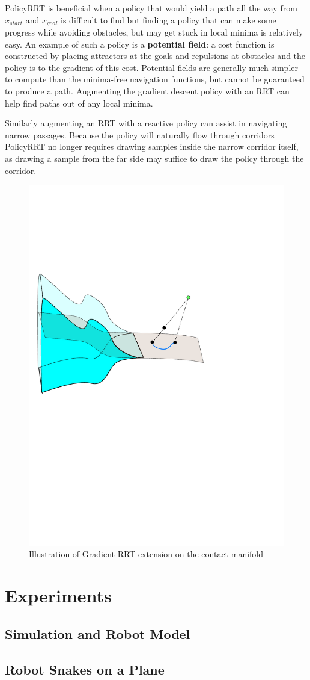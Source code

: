 \documentclass[../thesis.tex]{subfiles}
\begin{document}
PolicyRRT is beneficial when a policy that would yield a path all the way from $x_{start}$ and $x_{goal}$ is difficult to find but finding a policy that can make some progress while avoiding obstacles, but may get stuck in local minima is relatively easy. An example of such a policy is a \textbf{potential field}: a cost function is constructed by placing attractors at the goals and repulsions at obstacles and the policy is to the gradient of this cost.  Potential fields are generally much simpler to compute than the minima-free navigation functions, but cannot be guaranteed to produce a path.  Augmenting the gradient descent policy with an RRT can help find paths out of any local minima.

Similarly augmenting an RRT with a reactive policy can assist in navigating narrow passages.  Because the policy will naturally flow through corridors PolicyRRT no longer requires drawing samples inside the narrow corridor itself, as drawing a sample from the far side may suffice to draw the policy through the corridor.

\begin{figure}
  \centering
  \includegraphics[width=.5\linewidth]{./Planning/extend.pdf}
  
  \caption{Illustration of Gradient RRT extension on the contact manifold}
  \label{fig:Extend}
\end{figure}


\section{Experiments}
\subsection{Simulation and Robot Model}
\subsection{Robot Snakes on a Plane}
\end{document}
